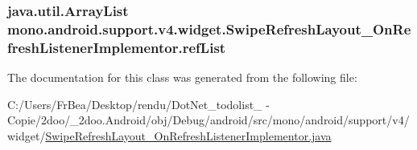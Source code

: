 \hypertarget{classmono_1_1android_1_1support_1_1v4_1_1widget_1_1_swipe_refresh_layout___on_refresh_listener_implementor_0c98e283833d140bd38ebdffa66c695b}{
\subsubsection[{refList}]{\setlength{\rightskip}{0pt plus 5cm}java.util.ArrayList {\bf mono.android.support.v4.widget.SwipeRefreshLayout\_\-OnRefreshListenerImplementor.refList}}}
\label{classmono_1_1android_1_1support_1_1v4_1_1widget_1_1_swipe_refresh_layout___on_refresh_listener_implementor_0c98e283833d140bd38ebdffa66c695b}




The documentation for this class was generated from the following file:\begin{CompactItemize}
\item 
C:/Users/FrBea/Desktop/rendu/DotNet\_\-todolist\_ - Copie/2doo/\_\-2doo.Android/obj/Debug/android/src/mono/android/support/v4/widget/\hyperlink{_swipe_refresh_layout___on_refresh_listener_implementor_8java}{SwipeRefreshLayout\_\-OnRefreshListenerImplementor.java}\end{CompactItemize}
